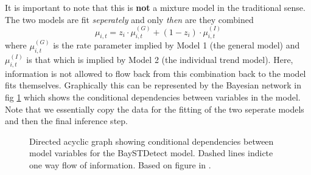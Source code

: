 \documentclass[11pt]{report}
\begin{document}
It is important to note that this is \textbf{not} a mixture model in the traditional sense. The two models are fit \emph{seperately} and only \emph{then} are they combined
\begin{equation}
\mu_{i,t} = z_i \cdot \mu_{i,t}^{(G)} + (1 - z_i) \cdot \mu_{i,t}^{(I)}
\end{equation}
where $\mu_{i,t}^{(G)}$ is the rate parameter implied by Model 1 (the general model) and $\mu_{i,t}^{(I)}$ is that which is implied by Model 2 (the individual trend model). Here, information is not allowed to flow back from this combination back to the model fits themselves. Graphically this can be represented by the Bayesian network in fig \ref{fig:baystdetect} which shows the conditional dependencies between variables in the model. Note that we essentially copy the data for the fitting of the two seperate models and then the final inference step. \\


\begin{figure}
\centering
{}
\label{fig:baystdetect}
\caption{Directed acyclic graph showing conditional dependencies between model variables for the BaySTDetect model. Dashed lines indicte one way flow of information. Based on figure in \citet{baystdetect}.}
\end{figure}
\end{document}
